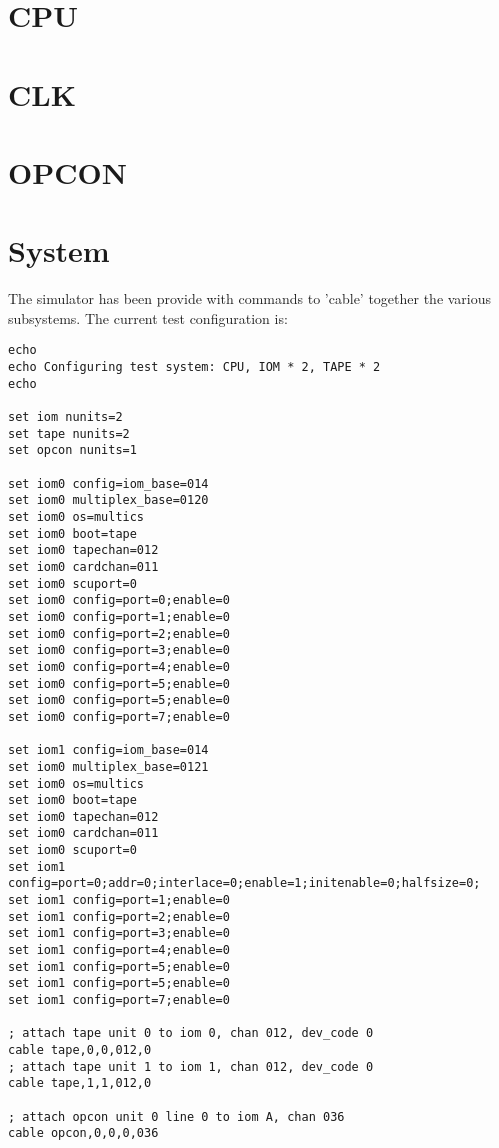 \documentclass[notitlepage]{report}
\begin{document}
\section {CPU}

\section {CLK}

\section {OPCON}

\section {System}

The simulator has been provide with commands to 'cable' together the various subsystems. The current test configuration is:

\begin{verbatim}
echo 
echo Configuring test system: CPU, IOM * 2, TAPE * 2 
echo 

set iom nunits=2 
set tape nunits=2 
set opcon nunits=1 

set iom0 config=iom_base=014
set iom0 multiplex_base=0120
set iom0 os=multics
set iom0 boot=tape
set iom0 tapechan=012
set iom0 cardchan=011
set iom0 scuport=0 
set iom0 config=port=0;enable=0 
set iom0 config=port=1;enable=0 
set iom0 config=port=2;enable=0 
set iom0 config=port=3;enable=0 
set iom0 config=port=4;enable=0 
set iom0 config=port=5;enable=0 
set iom0 config=port=5;enable=0 
set iom0 config=port=7;enable=0 

set iom1 config=iom_base=014
set iom0 multiplex_base=0121
set iom0 os=multics
set iom0 boot=tape
set iom0 tapechan=012
set iom0 cardchan=011
set iom0 scuport=0 
set iom1 config=port=0;addr=0;interlace=0;enable=1;initenable=0;halfsize=0; 
set iom1 config=port=1;enable=0 
set iom1 config=port=2;enable=0 
set iom1 config=port=3;enable=0 
set iom1 config=port=4;enable=0 
set iom1 config=port=5;enable=0 
set iom1 config=port=5;enable=0 
set iom1 config=port=7;enable=0 

; attach tape unit 0 to iom 0, chan 012, dev_code 0 
cable tape,0,0,012,0 
; attach tape unit 1 to iom 1, chan 012, dev_code 0 
cable tape,1,1,012,0 

; attach opcon unit 0 line 0 to iom A, chan 036 
cable opcon,0,0,0,036 
\end{verbatim}
\end{document}

